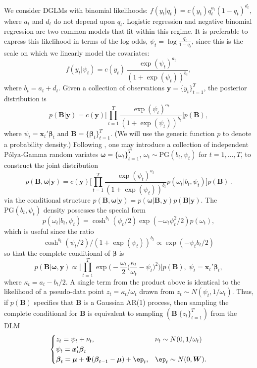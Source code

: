 \documentclass[12pt]{article}
\newcommand{\Polya}{P\'{o}lya}
\newcommand{\PG}{\text{PG}}
\newcommand{\bbeta}{\boldsymbol{\beta}}
\newcommand{\oomega}{\boldsymbol{\omega}}
\newcommand{\yy}{\boldsymbol{y}}
\newcommand{\vx}{\boldsymbol{x}}
\newcommand{\betap}{{\boldsymbol{B}}}
\newcommand{\bW}{\boldsymbol{W}}
\newcommand{\bPhi}{\boldsymbol{\Phi}}
\newcommand{\bmu}{\boldsymbol{\mu}}
\newcommand{\vep}{\boldsymbol{\ep}}
\begin{document}
We consider DGLMs with binomial likelihoods: \( f(y_t | q_t) = c(y_t) q_t^{a_t}
(1-q_t)^{d_t}, \) where $a_t$ and $d_t$ do not depend upon $q_t$.  Logistic
regression and negative binomial regression are two common models that fit
within this regime.  It is preferable to express this likelihood in terms of the
log odds, $\psi_t = \log \frac{q_t}{1-q_t}$, since this is the scale on which we
linearly model the covariates:
\[
f(y_t | \psi_t) = c(y_t) \, \frac{\exp(\psi_t)^{a_t}}{(1+\exp(\psi_t))^{b_t}},
\]
where $b_t = a_t + d_t$.  Given a collection of observations $\yy =
\{y_t\}_{t=1}^T$, the posterior distribution is
\[
p(\betap | \yy) = c(\yy) \Big[ \prod_{t=1}^T
\frac{\exp({\psi_t})^{a_t}}{(1+\exp({\psi_t}))^{b_t}}
\Big] p(\betap),
\]
where $\psi_t = \vx_t' \bbeta_t$ and $\betap = \{\bbeta_t\}_{t=1}^T$.  (We will use
the generic function $p$ to denote a probability density.)  Following
\cite{polson-etal-2013}, one may introduce a collection of independent
\Polya-Gamma random variates $\oomega = \{\omega_t\}_{t=1}^T$, $\omega_t \sim
\PG(b_t, \psi_t)$ for $t=1, \ldots, T$, to construct the joint distribution
\[
p(\betap, \oomega | \yy) = c(\yy) \Big[ \prod_{t=1}^T
\frac{\exp({\psi_t})^{a_t}}{(1+\exp({\psi_t}))^{b_t}} p(\omega_t | b_t, \psi_t)
\Big] p(\betap) \, .
\]
via the conditional structure $p(\betap, \oomega | \yy) = p(\oomega | \betap,
\yy) p(\betap | \yy)$.  The $\PG{}(b_t, \psi_t)$ density possesses the special
form
\[
p(\omega_t | b_t, \psi_t) = \cosh^{b_t}(\psi_t/2) \exp({- \omega_t \psi_t^2 / 2})
p(\omega_t),
\]
which is useful since the ratio
\begin{equation}
  \label{eqn:pg-cancellation}
  \cosh^{b_t}(\psi_t/2) / (1+\exp({\psi_t}))^{b_t}
  \propto
  \exp({-\psi_t b_t/2}) 
\end{equation}
so that the complete conditional of $\bbeta$ is
\[
p(\betap | \oomega, \yy) \propto \Big[ \prod_{t=1}^T \exp \Big(-\frac{\omega_t}{2}
\Big(\frac{\kappa_t}{\omega_t} - \psi_t\Big)^2 \Big) \Big] p(\betap), \; \psi_t
= \vx_t' \bbeta_t,
\]
where $\kappa_t = a_t - b_t / 2$.  A single term from the product above is
identical to the likelihood of a pseudo-data point $z_t = \kappa_t / \omega_t$
drawn from $z_t \sim N(\psi_t, 1/\omega_t)$.  Thus, if $p(\betap)$ specifies
that $\betap$ is a Gaussian AR(1) process, then sampling the complete
conditional for $\betap$ is equivalent to sampling $(\betap | \{z_t\}_{t=1}^T)$
from the DLM
\[
\begin{cases}
  z_t = \psi_t + \nu_t, & \nu_t \sim N(0, 1/\omega_t) \\
  \psi_t = \vx_t' \bbeta_t \\
  \bbeta_t = \bmu + \bPhi (\bbeta_{t-1} - \bmu) + \vep_t, & \vep_t \sim N(0, \bW).
\end{cases}
\]
\end{document}
